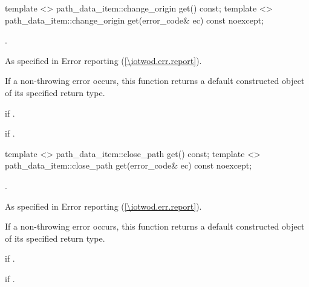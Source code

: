 \begin{itemdecl}
    template <>
    path_data_item::change_origin get() const;
    template <>
    path_data_item::change_origin get(error_code& ec) const noexcept;
\end{itemdecl}
\begin{itemdescr}
	\pnum
	\returns
	.
	
	\pnum
	\throws
	As specified in Error reporting (\ref{\iotwod.err.report}).
	
	\pnum
	\remarks
	If a non-throwing error occurs, this function returns a default constructed object of its specified return type.
	
	\pnum
	\errors
	 if .
	
	\pnum
	 if .

\end{itemdescr}

\begin{itemdecl}
    template <>
    path_data_item::close_path get() const;
    template <>
    path_data_item::close_path get(error_code& ec) const noexcept;
\end{itemdecl}
\begin{itemdescr}
	\pnum
	\returns
	.
	
	\pnum
	\throws
	As specified in Error reporting (\ref{\iotwod.err.report}).
	
	\pnum
	\remarks
	If a non-throwing error occurs, this function returns a default constructed object of its specified return type.
	
	\pnum
	\errors
	 if .
	
	\pnum
	 if .

\end{itemdescr}

